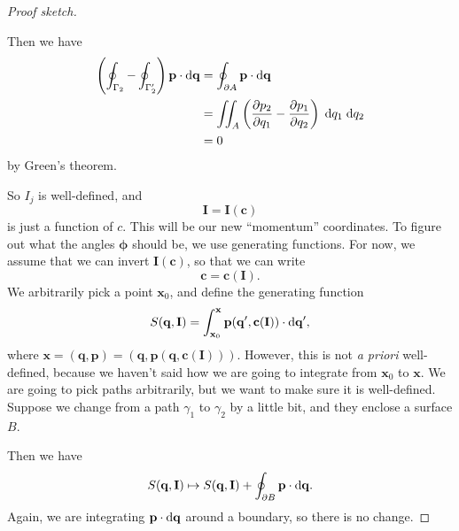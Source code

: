 \documentclass[a4paper]{article}
\begin{document}
\begin{proof}[Proof sketch]
\begin{center}
  \end{center}
  Then we have
  \begin{align*}
    \left(\oint_{\Gamma_2} - \oint_{\Gamma_2'}\right) \mathbf{p}\cdot \mathrm{d} \mathbf{q} &= \oint_{\partial A}\mathbf{p}\cdot \mathrm{d} \mathbf{q}\\
    &= \iint_A \left(\frac{\partial p_2}{\partial q_1} - \frac{\partial p_1}{\partial q_2}\right) \;\mathrm{d} q_1\;\mathrm{d} q_2\\
    &= 0
  \end{align*}
  by Green's theorem.

  So $I_j$ is well-defined, and
  \[
    \mathbf{I} = \mathbf{I}(\mathbf{c})
  \]
  is just a function of $c$. This will be our new ``momentum'' coordinates. To figure out what the angles $\boldsymbol\phi$ should be, we use generating functions. For now, we assume that we can invert $\mathbf{I}(\mathbf{c})$, so that we can write
  \[
    \mathbf{c} = \mathbf{c}(\mathbf{I}).
  \]
  We arbitrarily pick a point $\mathbf{x}_0$, and define the generating function
  \[
    S(\mathbf{q}, \mathbf{I}) = \int_{\mathbf{x}_0}^\mathbf{x} \mathbf{p}(\mathbf{q}', \mathbf{c}(\mathbf{I})) \cdot \mathrm{d} \mathbf{q}',
  \]
  where $\mathbf{x} = (\mathbf{q}, \mathbf{p}) = (\mathbf{q}, \mathbf{p}(\mathbf{q}, \mathbf{c}(\mathbf{I})))$. However, this is not \emph{a priori} well-defined, because we haven't said how we are going to integrate from $\mathbf{x}_0$ to $\mathbf{x}$. We are going to pick paths arbitrarily, but we want to make sure it is well-defined. Suppose we change from a path $\gamma_1$ to $\gamma_2$ by a little bit, and they enclose a surface $B$.
  \begin{center}
  \end{center}
  Then we have
  \[
    S(\mathbf{q}, \mathbf{I}) \mapsto S(\mathbf{q}, \mathbf{I}) + \oint_{\partial B} \mathbf{p} \cdot \mathrm{d} \mathbf{q}.
  \]
  Again, we are integrating $\mathbf{p} \cdot \mathrm{d}\mathbf{q}$ around a boundary, so there is no change.


\end{proof}
\end{document}
